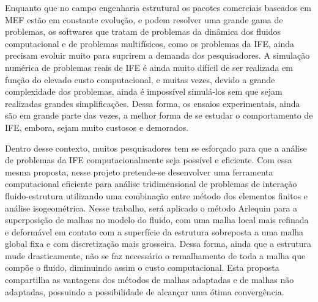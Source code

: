 \documentclass[tese_patricia.tex]{subfiles}
\begin{document}
Enquanto que no campo engenharia estrutural os pacotes comerciais baseados em MEF estão em constante evolução, e podem resolver uma grande gama de problemas, os softwares que tratam de problemas da dinâmica dos fluidos computacional e de problemas multifísicos, como os problemas da IFE, ainda precisam evoluir muito para suprirem a demanda dos pesquisadores. A simulação numérica de problemas reais de IFE é ainda muito difícil de ser realizada em função do elevado custo computacional, e muitas vezes, devido a grande complexidade dos problemas, ainda é impossível simulá-los sem que sejam realizadas grandes simplificações. Dessa forma, os ensaios experimentais, ainda são em grande parte das vezes, a melhor forma de se estudar o comportamento de IFE, embora, sejam muito custosos e demorados.

Dentro desse contexto, muitos pesquisadores tem se esforçado para que a análise de problemas da IFE computacionalmente seja possível e eficiente. Com essa mesma proposta, nesse projeto pretende-se desenvolver uma ferramenta computacional eficiente para análise tridimensional de problemas de interação fluido-estrutura utilizando uma combinação entre método dos elementos finitos e análise isogeométrica.  Nesse trabalho, será aplicado o método Arlequin para a superposição de malhas no modelo do fluido, com uma malha local mais refinada e deformável em contato com a superfície da estrutura sobreposta a uma malha global fixa e com discretização mais grosseira. Dessa forma, ainda que a estrutura mude drasticamente, não se faz necessário o remalhamento de toda a malha que compõe o fluido, diminuindo assim o custo computacional. Esta proposta compartilha as vantagens dos métodos de malhas adaptadas e de malhas não adaptadas, possuindo a possibilidade de alcançar uma ótima convergência.

%
%
\end{document}

